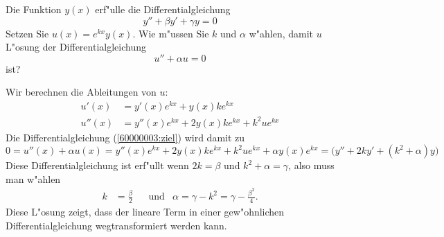 Die Funktion $y(x)$ erf"ulle die Differentialgleichung
\begin{equation}
y''+\beta y' + \gamma y=0
\label{60000003:vorgabe}
\end{equation}
Setzen Sie $u(x)=e^{k x}y(x)$.
Wie m"ussen Sie $k$ und $\alpha$ w"ahlen, damit $u$ L"osung der
Differentialgleichung
\begin{equation}
u''+\alpha u=0
\label{60000003:ziel}
\end{equation}
ist?

\begin{loesung}
Wir berechnen die Ableitungen von $u$:
\begin{align*}
u'(x)&=y'(x)e^{kx}+y(x)ke^{kx}\\
u''(x)&=y''(x)e^{kx}+2y(x)ke^{kx}+k^2ue^{kx}
\end{align*}
Die Differentialgleichung  (\ref{60000003:ziel}) wird damit
zu
\[
0
=
u''(x)+\alpha u(x)
=
y''(x)e^{kx}+2y(x)ke^{kx}+k^2ue^{kx}
+ \alpha y(x)e^{kx}
=
\bigl(
y''+2k y' +(k^2+\alpha)y
\bigr)
\]
Diese Differentialgleichung ist erf"ullt wenn $2k=\beta$ und
$k^2+\alpha=\gamma$, also muss man w"ahlen
\[
\begin{aligned}
k&=\frac{\beta}2
&
&\text{und}&
\alpha=\gamma-k^2=\gamma-\frac{\beta^2}4.
\end{aligned}
\]
Diese L"osung zeigt, dass der lineare Term in einer gew"ohnlichen
Differentialgleichung wegtransformiert werden kann.
\end{loesung}

